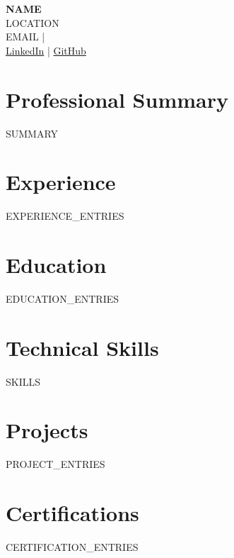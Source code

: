 \documentclass[11pt,a4paper]{article}
\begin{document}
\begin{center}
  {\LARGE\bfseries {{NAME}}} \\[4pt]
  {{LOCATION}} \\
  {{EMAIL}} \quad |  \\
  \href{{{LINKEDIN}}}{LinkedIn} \quad | \quad \href{{{GITHUB}}}{GitHub}
\end{center}

\section{Professional Summary}
{{SUMMARY}}

\section{Experience}
{{EXPERIENCE_ENTRIES}}

\section{Education}
{{EDUCATION_ENTRIES}}

\section{Technical Skills}
{{SKILLS}}

\section{Projects}
{{PROJECT_ENTRIES}}

\section{Certifications}
{{CERTIFICATION_ENTRIES}}
\end{document}
